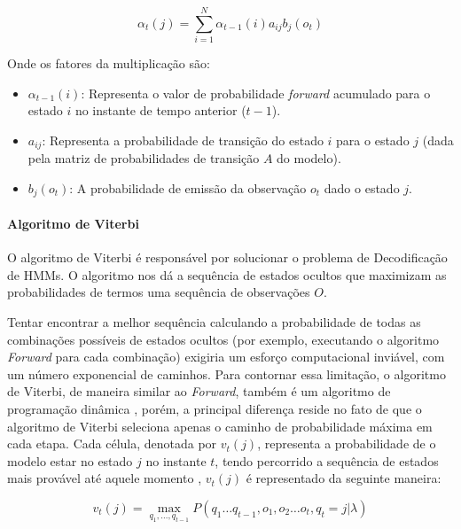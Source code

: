 \documentclass[
    12pt,                %
    openright,           %
    oneside,             %
    a4paper,             %
    english,             %
    brazil               %
]{abntex2}
\begin{document}
\begin{equation}
    \alpha_t(j) = \sum_{i=1}^{N} \alpha_{t-1}(i) a_{ij} b_j(o_t)
    \label{probabilidade_de_alfa}
\end{equation}

Onde os fatores da multiplicação são:

\begin{itemize}
    \item $\alpha_{t-1}(i)$: Representa o valor de probabilidade \textit{forward} acumulado para o estado $i$ no instante de tempo anterior ($t-1$).
    \item $a_{ij}$: Representa a probabilidade de transição do estado $i$ para o estado $j$ (dada pela matriz de probabilidades de transição $A$ do modelo).
    \item $b_j(o_t)$: A probabilidade de emissão da observação $o_t$ dado o estado $j$.
\end{itemize}

\paragraph{Algoritmo de Viterbi}

O algoritmo de Viterbi é responsável por solucionar o problema de Decodificação de HMMs.
O algoritmo nos dá a sequência de estados ocultos que maximizam as probabilidades de termos uma sequência de observações $O$.

Tentar encontrar a melhor sequência calculando a probabilidade de todas as combinações possíveis de estados ocultos
(por exemplo, executando o algoritmo \textit{Forward} para cada combinação) exigiria um esforço computacional inviável, 
com um número exponencial de caminhos. Para contornar essa limitação, o algoritmo de Viterbi, de maneira similar 
ao \textit{Forward}, também é um algoritmo de programação dinâmica \cite{jm3}, porém, a
principal diferença reside no fato de que o algoritmo de Viterbi seleciona apenas o caminho de probabilidade 
máxima em cada etapa. Cada célula, denotada por $v_t(j)$, representa a probabilidade de o modelo estar no estado $j$ 
no instante $t$, tendo percorrido a sequência de estados mais provável até aquele momento \cite{jm3}, $v_t(j)$ é representado da
seguinte maneira:

\begin{equation}
    v_t(j) = \max_{q_1,\dots,q_{t-1}} P(q_1 \dots q_{t-1}, o_1, o_2 \dots o_t, q_t = j | \lambda)
    \label{probabilidade_viterbi}
\end{equation}
\end{document}
